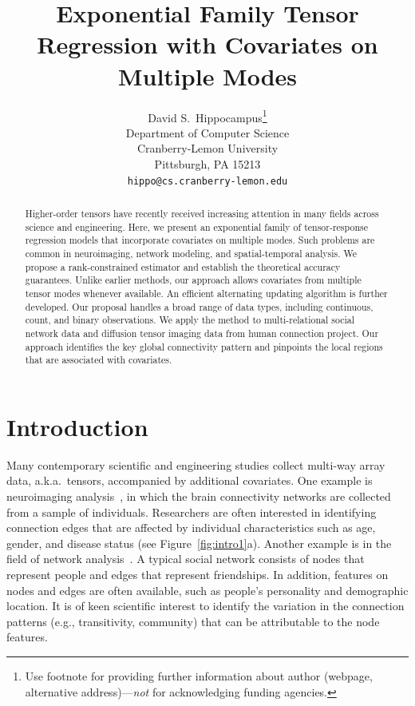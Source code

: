 \documentclass{article}
\title{Exponential Family Tensor Regression with Covariates on Multiple Modes }
\author{%
  David S.~Hippocampus\thanks{Use footnote for providing further information
    about author (webpage, alternative address)---\emph{not} for acknowledging
    funding agencies.} \\
  Department of Computer Science\\
  Cranberry-Lemon University\\
  Pittsburgh, PA 15213 \\
  \texttt{hippo@cs.cranberry-lemon.edu} \\

}
\theoremstyle{plain}
\theoremstyle{definition}
\begin{document}
\maketitle

\begin{abstract}
  Higher-order tensors have recently received increasing attention in many fields across science and engineering. Here, we present an exponential family of tensor-response regression models that incorporate covariates on multiple modes. Such problems are common in neuroimaging, network modeling, and spatial-temporal analysis. We propose a rank-constrained estimator and establish the theoretical accuracy guarantees. Unlike earlier methods, our approach allows covariates from multiple tensor modes whenever available. An efficient alternating updating algorithm is further developed. Our proposal handles a broad range of data types, including continuous, count, and binary observations. We apply the method to multi-relational social network data and diffusion tensor imaging data from human connection project. Our approach identifies the key global connectivity pattern and pinpoints the local regions that are associated with covariates.
\end{abstract}

\section{Introduction}

Many contemporary scientific and engineering studies collect multi-way array data, a.k.a.\ tensors, accompanied by additional covariates. One example is neuroimaging analysis~\cite{sun2017store,zhou2013tensor}, in which the brain connectivity networks are collected from a sample of individuals. Researchers are often interested in identifying connection edges that are affected by individual characteristics such as age, gender, and disease status (see Figure~\ref{fig:intro1}a). Another example is in the field of network analysis~\cite{baldin2018optimal,hoff2005bilinear}. A typical social network consists of nodes that represent people and edges that represent friendships. In addition, features on nodes and edges are often available, such as people's personality and demographic location. It is of keen scientific interest to identify the variation in the connection patterns (e.g., transitivity, community) that can be attributable to the node features.  
\end{document}
